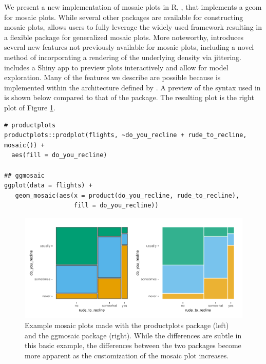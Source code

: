 We present a new implementation of mosaic plots in R, , that implements a  geom for mosaic plots. While several other packages are available for constructing mosaic plots,  allows users to fully leverage the widely used  framework resulting in a flexible package for generalized mosaic plots. More noteworthy,  introduces several new features not previously available for mosaic plots, including a novel method of incorporating a rendering of the underlying density via jittering.  includes a Shiny app to preview plots interactively and allow for model exploration. Many of the features we describe are possible because  is implemented within the architecture defined by . A preview of the syntax used in  is shown below compared to that of the  package. The resulting plot is the right plot of Figure \ref{fig:prodplot}.

\begin{verbatim}
# productplots
productplots::prodplot(flights, ~do_you_recline + rude_to_recline, mosaic()) + 
  aes(fill = do_you_recline)

## ggmosaic
ggplot(data = flights) +
   geom_mosaic(aes(x = product(do_you_recline, rude_to_recline),
                   fill = do_you_recline))
\end{verbatim}

\begin{figure}

{\centering \includegraphics[width=1\linewidth]{RJ-2023-013_files/figure-latex/prodplot-1} 

}

\caption{Example mosaic plots made with the productplots package (left) and the ggmosaic package (right). While the differences are subtle in this basic example, the differences between the two packages become more apparent as the customization of the mosaic plot increases.}\label{fig:prodplot}
\end{figure}

